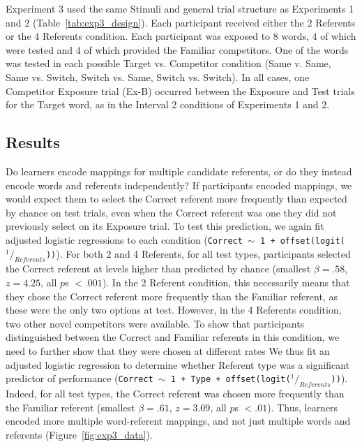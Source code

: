 \documentclass[authoryear,review]{elsarticle}
\begin{document}
Experiment 3 used the same Stimuli and general trial structure as Experiments 1 and 2 (Table~\ref{tab:exp3_design}). Each participant received either the 2 Referents or the 4 Referents condition. Each participant was exposed to 8 words, 4 of which were tested and 4 of which provided the Familiar competitors. One of the words was tested in each possible Target vs. Competitor condition (Same v. Same, Same vs. Switch, Switch vs. Same, Switch vs. Switch). In all cases, one Competitor Exposure trial (Ex-B) occurred between the Exposure and Test trials for the Target word, as in the Interval 2 conditions of Experiments 1 and 2. 

\subsection{Results}

Do learners encode mappings for multiple candidate referents, or do they instead encode words and referents independently? If participants encoded mappings, we would expect them to select the Correct referent more frequently than expected by chance on test trials, even when the Correct referent was one they did not previously select on its Exposure trial. To test this prediction, we again fit adjusted logistic regressions to each condition ({\small{\tt{Correct $\sim$ 1 + offset(logit($^1/_{Referents}$))}}}). For both 2 and 4 Referents, for all test types, participants selected the Correct referent at levels higher than predicted by chance (smallest $\beta =  .58$, $z=4.25$, all $p$s $< .001$). In the 2 Referent condition, this necessarily means that they chose the Correct referent more frequently than the Familiar referent, as these were the only two options at test. However, in the 4 Referents condition, two other novel competitors were available. To show that participants distinguished between the Correct and Familiar referents in this condition, we need to further show that they were chosen at different rates We thus fit an adjusted logistic regression to determine whether Referent type was a significant predictor of performance ({\small{\tt{Correct $\sim$ 1 + Type + offset(logit($^1/_{Referents}$))}}}). Indeed, for all test types, the Correct referent was chosen more frequently than the Familiar referent (smallest $\beta =  .61$, $z=3.09$, all $p$s $< .01$). Thus, learners encoded more multiple word-referent mappings, and not just multiple words and referents (Figure~\ref{fig:exp3_data}).
\end{document}
